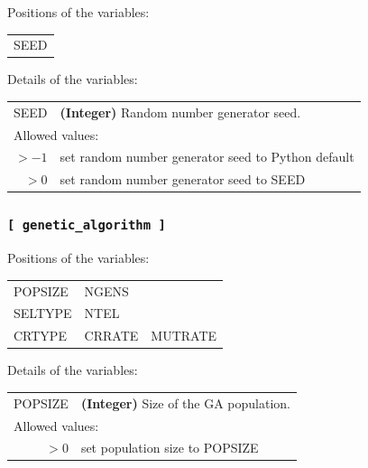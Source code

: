 \documentclass[10pt,a4paper]{report}
\numberwithin{equation}{section}
\begin{document}
Positions of the variables:
\begin{center}
  \begin{tabular}{l}
    SEED
  \end{tabular}
\end{center}

\noindent Details of the variables:
\vspace{2ex}

{
\begin{tabular}{r@{ : }l}
\label{descr:seed}
      SEED&\textbf{(Integer)} Random number generator seed.                                                                        \\ 
\multicolumn{2}{l}{Allowed values:} \\ 
    \(>-1\)&set random number generator seed to Python default                                                  \\ 
    \(>0\)&set random number generator seed to SEED                                                             \\ 
\end{tabular}
\vspace{1ex}
}

\subsubsection{\texttt{[~genetic\_algorithm~]}}
\label{sec:inp-ga}

Positions of the variables:
\begin{center}
  \begin{tabular}{lll}
    POPSIZE & NGENS & \\
    SELTYPE & NTEL & \\
    CRTYPE & CRRATE & MUTRATE \\
  \end{tabular}
\end{center}

\noindent Details of the variables:
\vspace{2ex}

{
\begin{tabular}{r@{ : }l}
\label{descr:popsize}
   POPSIZE&\textbf{(Integer)} Size of the GA population.                                                                           \\ 
\multicolumn{2}{l}{Allowed values:} \\ 
    \(>0\)&set population size to POPSIZE                                                                       \\ 
\end{tabular}
\vspace{1ex}
}
\end{document}
